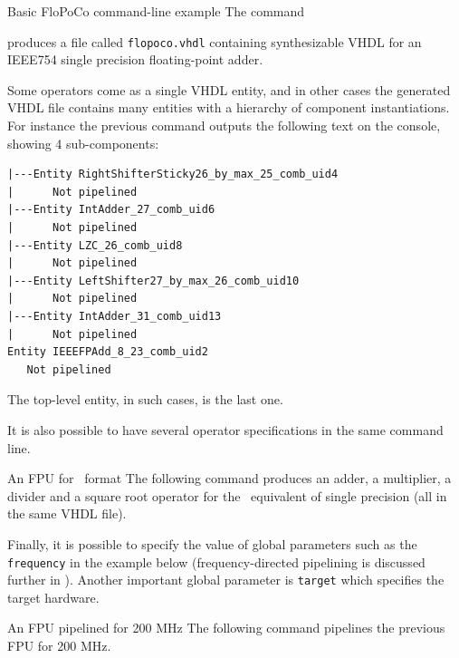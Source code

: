 \documentclass{article}
\begin{document}
\begin{flopocobox}{Basic FloPoCo command-line example}
  The command
  
    produces a file called \texttt{flopoco.vhdl} containing synthesizable VHDL for an IEEE754 single precision floating-point adder.
  
\end{flopocobox}

Some operators come as a single VHDL entity, and in other cases the generated VHDL file contains many entities with a hierarchy of component instantiations.
For instance the previous command outputs the following text on the console, showing 4 sub-components:

\begin{small}
\begin{verbatim}
|---Entity RightShifterSticky26_by_max_25_comb_uid4
|      Not pipelined
|---Entity IntAdder_27_comb_uid6
|      Not pipelined
|---Entity LZC_26_comb_uid8
|      Not pipelined
|---Entity LeftShifter27_by_max_26_comb_uid10
|      Not pipelined
|---Entity IntAdder_31_comb_uid13
|      Not pipelined
Entity IEEEFPAdd_8_23_comb_uid2
   Not pipelined
\end{verbatim}  
\end{small}
The top-level entity, in such cases, is the last one.

It is also possible to have several operator specifications in the same command line.
\begin{flopocobox}{An FPU for \Float\ format}
  The following command produces an adder, a multiplier, a divider and a square root operator for the \Float\ equivalent of single precision (all in the same VHDL file).
  
\end{flopocobox}

Finally, it is possible to specify the value of global parameters such as the \texttt{frequency} in the example below (frequency-directed pipelining is discussed further in ).
Another important global parameter is \texttt{target} which specifies the target hardware.


\begin{flopocobox}{An FPU pipelined for 200 MHz}
  The following command pipelines the previous FPU for  200 MHz.
  
\end{flopocobox}
\end{document}
